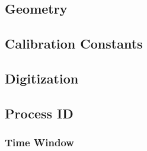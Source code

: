 \section{}


\subsection{Geometry}

\subsection{Calibration Constants}

\subsection{Digitization}

\subsection{Process ID}

\subsubsection{Time Window}


